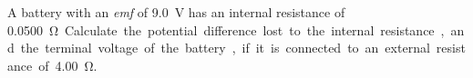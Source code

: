 \begin{example}
  A battery with an \emph{emf} of \SI{9.0}{\volt} has an internal resistance of
  \SI{.0500}\ohm. Calculate the potential difference lost to the internal
  resistance, and the terminal voltage of the battery, if it is connected to an
  external resistance of \SI{4.00}\ohm.
\end{example}
